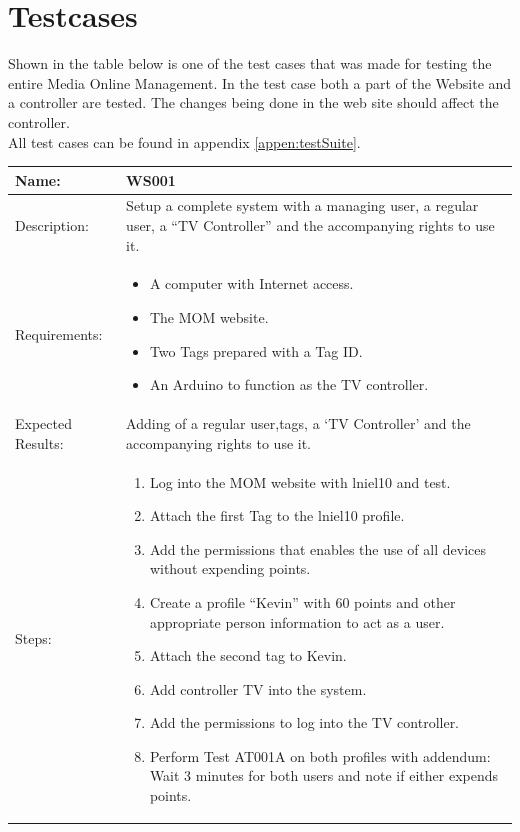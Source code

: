 \section{Testcases}
\label{sec:testcase}
Shown in the table below is one of the test cases that was made for testing the entire Media Online Management. In the test case both a part of the Website and a controller are tested. The changes being done in the web site should affect the controller.\\ 
 All test cases can be found in appendix \vref{appen:testSuite}.
\begin{table}[h]
	\centering
		\begin{tabular*}{\textwidth}{|l|l|}
		\hline
		\hline
		Name: & WS001\\
		\hline
		Description: & \parbox{0.70\textwidth}{Setup a complete system with a managing user, a regular user, a ``TV Controller'' and the accompanying rights to use it.}\\
		\hline
		Requirements: & \parbox{0.70\textwidth}{
		\begin{itemize}
			\item A computer with Internet access.
			\item The MOM website.
			\item Two Tags prepared with a Tag ID.
			\item An Arduino to function as the TV controller. 
		\end{itemize}}
		\\
		\hline
		Expected Results: & \parbox{.70\textwidth}{Adding of a regular user,tags, a `TV Controller' and the accompanying rights to use it.}\\
		\hline
		Steps: & \parbox{.70\textwidth}{
		\begin{enumerate}
			\item Log into the MOM website with lniel10 and test.
			\item Attach the first Tag to the lniel10 profile.
			\item Add the permissions that enables the use of all devices without expending points.
			\item Create a profile ``Kevin'' with 60 points and other appropriate person information to act as a user.
			\item Attach the second tag to Kevin.
			\item Add controller TV into the system.
			\item Add the permissions to log into the TV controller.
			\item Perform Test AT001A on both profiles with addendum: Wait 3 minutes for both users and note if either expends points.
		\end{enumerate}}
		\\		
		\hline
		\end{tabular*}
\end{table}


